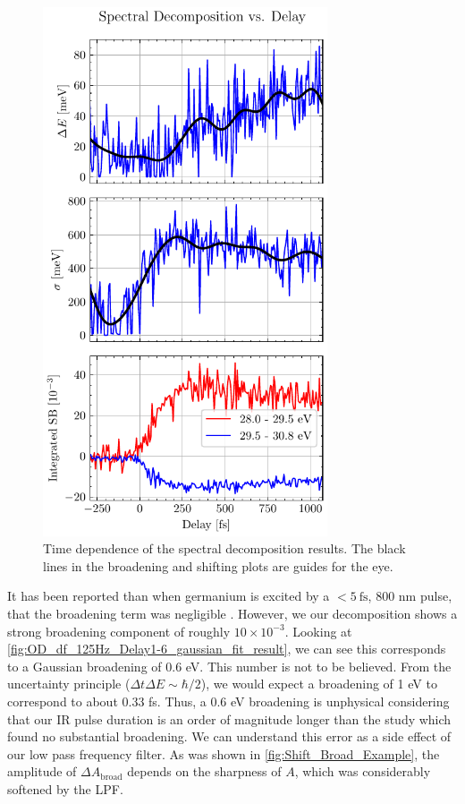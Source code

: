 \begin{figure}
	\centering
	\includegraphics[width=0.75\textwidth]{figures/chap4/OD_df_125Hz_Delay1-6_gaussian_shift_broad.pdf}
	\caption{Time dependence of the spectral decomposition results. The black lines in the broadening and shifting plots are guides for the eye.}
	\label{fig:OD_df_125Hz_Delay1-6_gaussian_shift_broad}
\end{figure}

It has been reported than when germanium is excited by a $< 5 \ \textrm{fs}$, 800 nm pulse, that the broadening term was negligible \cite{zurchDirectSimultaneousObservation2017}. However, we our decomposition shows a strong broadening component of roughly $10 \times 10^{-3}$. Looking at \cref{fig:OD_df_125Hz_Delay1-6_gaussian_fit_result}, we can see this corresponds to a Gaussian broadening of 0.6 eV. This number is not to be believed. From the uncertainty principle ($\Delta t \Delta E \sim \hbar/2$), we would expect a broadening of 1 eV to correspond to about 0.33 fs. Thus, a 0.6 eV broadening is unphysical considering that our IR pulse duration is an order of magnitude longer than the study which found no substantial broadening. We can understand this error as a side effect of our low pass frequency filter. As was shown in \cref{fig:Shift_Broad_Example}, the amplitude of $\Delta A_{\textrm{broad}}$ depends on the sharpness of $A$, which was considerably softened by the LPF.

